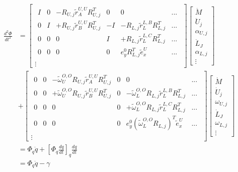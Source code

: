 \begin{equation}
\begin{split}
\frac{d^2\Phi}{dt^2}&=
\begin{bmatrix}
\begin{array}{cccccc} %
I & 0 & -R_{U,j}{\tilde r}^{U,U}_A R_{U,j}^T & 0 & 0 & ... \\
0 & I & +R_{U,j}{\tilde r}^{U,U}_B R_{U,j}^T & -I& -R_{L,j}{\tilde r}^{L,B}_L R_{L,j}^T & ...\\
0 & 0 & 0 & I & +R_{L,j}{\tilde r}^{L,C}_L R_{L,j}^T & ... \\
0 & 0 & 0 & 0 & e_{y}^0 R_{L,j}^T \tilde{e}_{x}^{U} & ... 
\end{array}\\
\vdots
\end{bmatrix}
\begin{bmatrix}
\ddot{M} \\
\ddot{U}_j \\
\alpha_{U,j} \\
\dot{L}_J \\
\alpha_{L,j} \\
\vdots
\end{bmatrix} \label{eq:PhiDDot3D}\\
&+
\begin{bmatrix}
\begin{array}{cccccc} %
0 & 0 & -{\tilde{\omega}^{O,O}_{U}}R_{U,j}{\tilde r}^{U,U}_A R_{U,j}^T & 0 & 0 & ... \\
0 & 0 & +{\tilde{\omega}^{O,O}_{U}}R_{U,j}{\tilde r}^{U,U}_B R_{U,j}^T & 0& -{\tilde{\omega}^{O,O}_{L}}R_{L,j}{\tilde r}^{L,B}_L R_{L,j}^T & ...\\
0 & 0 & 0 & 0 & +{\tilde{\omega}^{O,O}_{L}}R_{L,j}{\tilde r}^{L,C}_L R_{L,j}^T & ... \\
0 & 0 & 0 & 0 & e_{y}^0 ({\tilde{\omega}^{O,O}_{L}}R_{L,j} )^T \tilde{e}_{x}^{U} & ... 
\end{array}\\
\vdots
\end{bmatrix}
\begin{bmatrix}
\dot{M} \\
\dot{U}_j \\
\omega_{U,j} \\
\dot{L}_J \\
\omega_{L,j} \\
\vdots
\end{bmatrix} \\
&=\Phi_q \ddot{q} + [\Phi_{q}\tfrac{dq}{dt}]_q\tfrac{dq}{dt} \\
&=\Phi_q \ddot{q}-\gamma
\end{split}
\end{equation}



